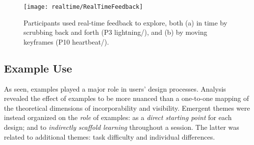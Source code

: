    
   \begin{figure}
    \centering
    \texttt{[image: realtime/RealTimeFeedback]}
    \caption{Participants used real-time feedback to explore, both (a) in time by scrubbing back and forth (P3 lightning/\lo), and (b) by moving keyframes (P10 heartbeat/\vis).
        }
    \label{fig:realtimefeedback}
\end{figure}
    
   

	



%
%
\subsection{Example Use}  %

As seen, examples played a major role in users' design processes.
Analysis revealed the effect of examples to be more nuanced than %
a one-to-one mapping of the theoretical dimensions of incorporability and visibility.
Emergent themes were instead organized on the \emph{role} of examples: %
as a \emph{direct starting point} for each design; and
to \emph{indirectly scaffold learning} throughout a session.
The latter was related to additional themes: task difficulty and individual differences.


